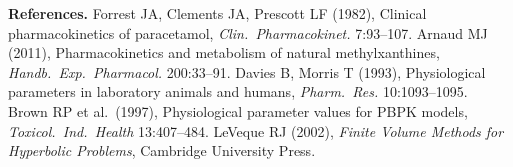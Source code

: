 \documentclass[10.5pt]{article}
\begin{document}
\vspace{4pt}
{\footnotesize\textbf{References.} Forrest JA, Clements JA, Prescott LF (1982), Clinical pharmacokinetics of paracetamol,
\textit{Clin.\ Pharmacokinet.} 7:93--107. Arnaud MJ (2011), Pharmacokinetics and metabolism of natural methylxanthines,
\textit{Handb.\ Exp.\ Pharmacol.} 200:33--91. Davies B, Morris T (1993), Physiological parameters in laboratory animals and
humans, \textit{Pharm.\ Res.} 10:1093--1095. Brown RP et al.\ (1997), Physiological parameter values for PBPK models,
\textit{Toxicol.\ Ind.\ Health} 13:407--484. LeVeque RJ (2002), \textit{Finite Volume Methods for Hyperbolic Problems},
Cambridge University Press.}
\end{document}
